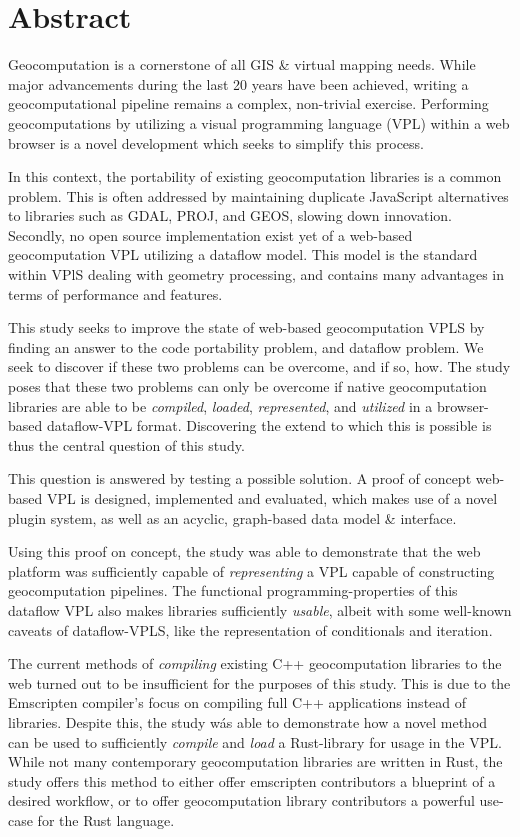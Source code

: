 \chapter*{Abstract}
Geocomputation is a cornerstone of all GIS \& virtual mapping needs.
While major advancements during the last 20 years have been achieved, writing a geocomputational pipeline remains a complex, non-trivial exercise. 
Performing geocomputations by utilizing a visual programming language (VPL) within a web browser is a novel development which seeks to simplify this process.

In this context, the portability of existing geocomputation libraries is a common problem.
This is often addressed by maintaining duplicate JavaScript alternatives to libraries such as GDAL, PROJ, and GEOS, slowing down innovation.  
Secondly, no open source implementation exist yet of a web-based geocomputation VPL utilizing a dataflow model.
This model is the standard within VPlS dealing with geometry processing, and contains many advantages in terms of performance and features.

This study seeks to improve the state of web-based geocomputation VPLS by finding an answer to the code portability problem, and dataflow problem.
We seek to discover if these two problems can be overcome, and if so, how. 
The study poses that these two problems can only be overcome if native geocomputation libraries are able to be \emph{compiled}, \emph{loaded}, \emph{represented}, and \emph{utilized} in a browser-based dataflow-VPL format.
Discovering the extend to which this is possible is thus the central question of this study. 

This question is answered by testing a possible solution.
A proof of concept web-based VPL is designed, implemented and evaluated, which makes use of a novel plugin system, as well as an acyclic, graph-based data model \& interface.

Using this proof on concept, the study was able to demonstrate that the web platform was sufficiently capable of \emph{representing} a VPL capable of constructing geocomputation pipelines.
The functional programming-properties of this dataflow VPL also makes libraries sufficiently \emph{usable}, albeit with some well-known caveats of dataflow-VPLS, like the representation of conditionals and iteration. 

The current methods of \emph{compiling} existing C++ geocomputation libraries to the web turned out to be insufficient for the purposes of this study.  
This is due to the Emscripten compiler's focus on compiling full C++ applications instead of libraries.
Despite this, the study wás able to demonstrate how a novel method can be used to sufficiently \emph{compile} and \emph{load} a Rust-library for usage in the VPL.
While not many contemporary geocomputation libraries are written in Rust, the study offers this method to either offer emscripten contributors a blueprint of a desired workflow, or to offer geocomputation library contributors a powerful use-case for the Rust language. 

